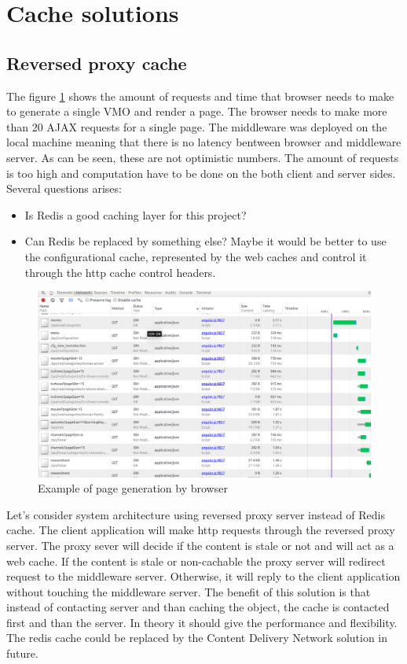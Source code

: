 \section{Cache solutions}

\subsection{Reversed proxy cache}

The figure \ref{fig:req_amount} shows the amount of requests and time that browser needs to make to generate a single VMO and  render a page. The browser needs to make more than 20 AJAX requests for a single page. The middleware was deployed on the local machine meaning that there is no latency bentween browser and middleware server. As can be seen, these are not optimistic numbers. The amount of requests is too high and computation have to be done on the both client and server sides. Several questions arises:
\begin{itemize}
	\item Is Redis a good caching layer for this project?
	\item Can Redis be replaced by something else? Maybe it would be better to use the configurational cache, represented by the web caches and control it through the http cache control headers.
\end{itemize}


\begin{figure}[h]
    \centering
	\includegraphics[width=\textwidth]{images/amount_of_requests.png}
    \caption{Example of page generation by browser}
    \label{fig:req_amount}
\end{figure}


Let’s consider system architecture using reversed proxy server instead of Redis cache. The client application will make http requests through the reversed proxy server. The proxy sever will decide if the content is stale or not and will act as a web cache. If the content is stale or non-cachable the proxy server will redirect request to the middleware server. Otherwise, it
will reply to the client application without touching the middleware server. The benefit of this solution is that instead of contacting server and than caching the object, the cache is contacted first and than the server. In theory it should give the performance and flexibility. The redis cache could be replaced by the Content Delivery Network solution in future.

